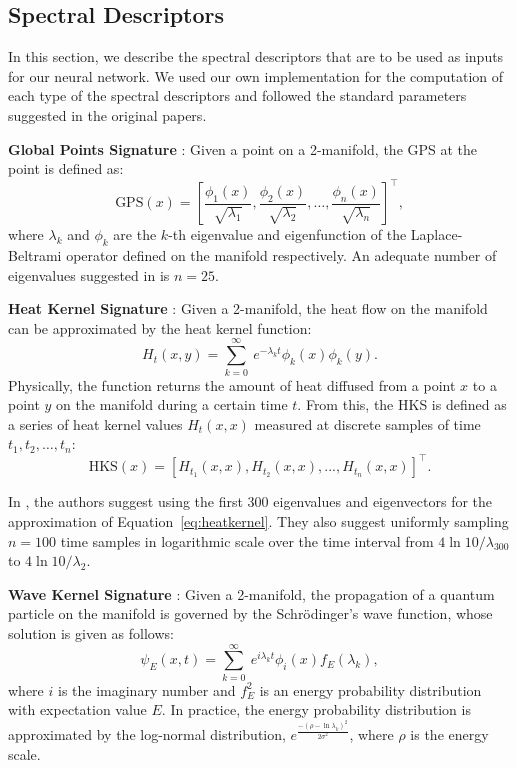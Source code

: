 \documentclass[5p,twocolumn,10pt,times]{elsarticle}
\begin{document}
\subsection{Spectral Descriptors}
\label{sec:spectral}
In this section, we describe the spectral descriptors that are to be used as inputs for our neural network. We used our own implementation for the computation of each type of the spectral descriptors and followed the standard parameters suggested in the original papers.

\textbf{Global Points Signature} \cite{rustamov2007laplace}: Given a point on a 2-manifold, the GPS at the point is defined as:
\begin{equation}
    \text{GPS}(x) = \left[
    \frac{\phi_1(x)}{\sqrt{\lambda_1}},\frac{\phi_2(x)}{\sqrt{\lambda_2}}, \ldots, \frac{\phi_n(x)}{\sqrt{\lambda_n}} \right]^\top,
\end{equation}
where $\lambda_k$ and $\phi_k$ are the $k$-th eigenvalue and eigenfunction of the Laplace-Beltrami operator defined on the manifold respectively. An adequate number of eigenvalues suggested in \cite{rustamov2007laplace} is $n=25$. 

\textbf{Heat Kernel Signature} \cite{sun2009concise}: Given a 2-manifold, the heat flow on the manifold can be approximated by the heat kernel function:
\begin{equation}
    H_t(x,y)=\sum_{k=0}^{\infty}\ e^{-\lambda_k t}\phi_k(x)\phi_k(y).
    \label{eq:heatkernel}
\end{equation}
Physically, the function returns the amount of heat diffused from a point $x$ to a point $y$ on the manifold during a certain time $t$. From this, the HKS is defined as a series of heat kernel values $H_t(x,x)$ measured at discrete samples of time $t_1, t_2, \ldots, t_n$:
\begin{equation}
    \text{HKS}(x) = \left[ H_{t_1}(x,x),H_{t_2}(x,x),...,H_{t_n}(x,x) \right]^\top.
\end{equation}

In \cite{sun2009concise}, the authors suggest using the first 300 eigenvalues and eigenvectors for the approximation of Equation~\ref{eq:heatkernel}. They also suggest uniformly sampling $n=100$ time samples in logarithmic scale over the time interval from $4\ln 10/\lambda_{300}$ to $4\ln 10/\lambda_2$.

\textbf{Wave Kernel Signature} \cite{aubry2011wave}: Given a 2-manifold, the propagation of a quantum particle on the manifold is governed by the Schr\"{o}dinger's wave function, whose solution is given as follows:
\begin{equation}
    \psi_E(x,t) =\sum_{k=0}^{\infty}\ e^{i \lambda_k t}\phi_i(x)f_E(\lambda_k),
\end{equation}
where $i$ is the imaginary number and $f_E^2$ is an energy probability distribution with expectation value $E$. In practice, the energy probability distribution is approximated by the log-normal distribution, $e^{\frac{-(\rho-\ln \lambda_k)^2}{2\sigma^2}}$, where $\rho$ is the energy scale.
\end{document}
